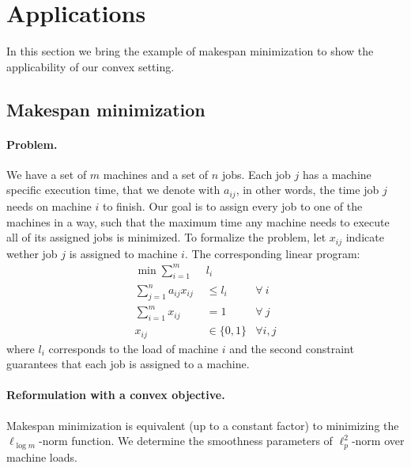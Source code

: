 
\section{Applications} \label{appix-applications}

In this section we bring the example of makespan minimization to show the applicability of our convex setting.

\subsection{Makespan minimization}

\paragraph{Problem.}
We have a set of $m$ machines and a set of $n$ jobs. Each job $j$ has a machine specific execution time, that we denote with $a_{ij}$, in other words, the time job $j$ needs on machine $i$ to finish. Our goal is to assign every job to one of the machines in a way, such that the maximum time any machine needs to execute all of its assigned jobs is minimized. To formalize the problem, let $x_{ij}$ indicate wether job $j$ is assigned to machine $i$. The corresponding linear program:
%
\begin{align*}
    \min \sum_{i = 1}^{m}\ \ & l_i \\
    \sum_{j = 1}^{n} a_{ij} x_{ij} &\le l_i & \forall\ i \\
    \sum_{i=1}^{m} x_{ij} & = 1 & \forall\ j \\
    x_{ij} & \in \{0,1\} & \forall i,j
\end{align*}
%
where $l_i$ corresponds to the load of machine $i$ and the second constraint guarantees that each job is assigned to a machine.

\paragraph{Reformulation with a convex objective.}
Makespan minimization is equivalent (up to a constant factor) to minimizing the $\ell_{\log m}$-norm function.
We determine the smoothness parameters of $\ell_{p}^{2}$-norm over machine loads.

